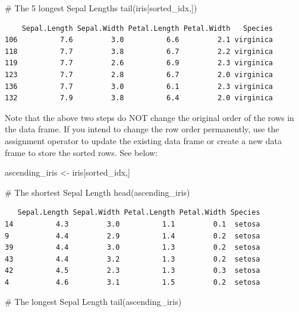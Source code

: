 \documentclass[
  letterpaper,
]{book}
\newenvironment{Shaded}{\begin{snugshade}}{\end{snugshade}}
\newcommand{\CommentTok}[1]{\textcolor[rgb]{0.37,0.37,0.37}{#1}}
\newcommand{\FunctionTok}[1]{\textcolor[rgb]{0.28,0.35,0.67}{#1}}
\newcommand{\NormalTok}[1]{\textcolor[rgb]{0.00,0.23,0.31}{#1}}
\newcommand{\OtherTok}[1]{\textcolor[rgb]{0.00,0.23,0.31}{#1}}
\begin{document}
\begin{Shaded}
\begin{Highlighting}[]
\CommentTok{\# The 5 longest Sepal Lengths}
\FunctionTok{tail}\NormalTok{(iris[sorted\_idx,])}
\end{Highlighting}
\end{Shaded}

\begin{verbatim}
    Sepal.Length Sepal.Width Petal.Length Petal.Width   Species
106          7.6         3.0          6.6         2.1 virginica
118          7.7         3.8          6.7         2.2 virginica
119          7.7         2.6          6.9         2.3 virginica
123          7.7         2.8          6.7         2.0 virginica
136          7.7         3.0          6.1         2.3 virginica
132          7.9         3.8          6.4         2.0 virginica
\end{verbatim}

Note that the above two steps do NOT change the original order of the
rows in the data frame. If you intend to change the row order
permanently, use the assignment operator to update the existing data
frame or create a new data frame to store the sorted rows. See below:

\begin{Shaded}
\begin{Highlighting}[]
\NormalTok{ascending\_iris }\OtherTok{\textless{}{-}}\NormalTok{ iris[sorted\_idx,]}

\CommentTok{\# The shortest Sepal Length}
\FunctionTok{head}\NormalTok{(ascending\_iris)}
\end{Highlighting}
\end{Shaded}

\begin{verbatim}
   Sepal.Length Sepal.Width Petal.Length Petal.Width Species
14          4.3         3.0          1.1         0.1  setosa
9           4.4         2.9          1.4         0.2  setosa
39          4.4         3.0          1.3         0.2  setosa
43          4.4         3.2          1.3         0.2  setosa
42          4.5         2.3          1.3         0.3  setosa
4           4.6         3.1          1.5         0.2  setosa
\end{verbatim}

\begin{Shaded}
\begin{Highlighting}[]
\CommentTok{\# The longest Sepal Length}
\FunctionTok{tail}\NormalTok{(ascending\_iris)}
\end{Highlighting}
\end{Shaded}
\end{document}
